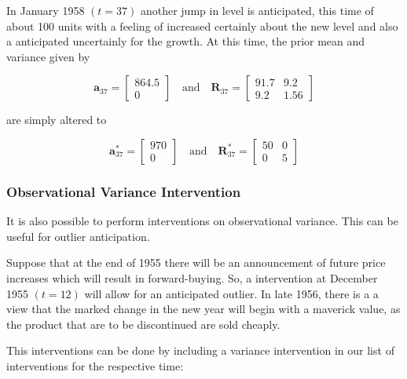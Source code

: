 \documentclass[
]{article}
\begin{document}
In January 1958 \((t=37)\) another jump in level is anticipated, this
time of about 100 units with a feeling of increased certainly about the
new level and also a anticipated uncertainly for the growth. At this
time, the prior mean and variance given by

\[
\mathbf{a}_{37} = \begin{bmatrix}
864.5 \\
0
\end{bmatrix}
\quad 
\text{and}
\quad 
\mathbf{R}_{37} = \begin{bmatrix}
91.7 & 9.2 \\
9.2 & 1.56
\end{bmatrix}
\]

are simply altered to

\[
\mathbf{a}^{*}_{37} = \begin{bmatrix}
970 \\
0
\end{bmatrix}
\quad 
\text{and}
\quad 
\mathbf{R}^{*}_{37} = \begin{bmatrix}
50 & 0 \\
0 & 5
\end{bmatrix}
\]

\hypertarget{observational-variance-intervention}{%
\subsubsection{Observational Variance
Intervention}\label{observational-variance-intervention}}

It is also possible to perform interventions on observational variance.
This can be useful for outlier anticipation.

Suppose that at the end of 1955 there will be an announcement of future
price increases which will result in forward-buying. So, a intervention
at December 1955 \((t=12)\) will allow for an anticipated outlier. In
late 1956, there is a a view that the marked change in the new year will
begin with a maverick value, as the product that are to be discontinued
are sold cheaply.

This interventions can be done by including a variance intervention in
our list of interventions for the respective time:
\end{document}
